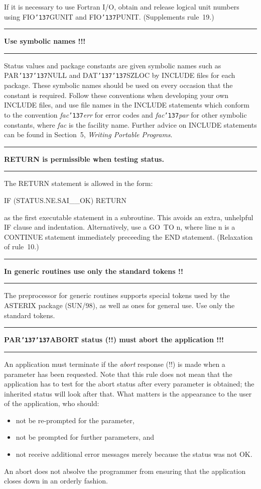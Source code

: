 \documentclass[twoside,11pt,nolof,noabs]{starlink}
\newcounter{sruleno}
\providecommand{\srule}[1]{
    \addtocounter{sruleno}{1}
    \goodbreak
    \rule{\textwidth}{0.3mm}
    \textbf{#1} \scpushright{ \textbf{\thesruleno}}
    \rule{\textwidth}{0.1mm}
}
\renewcommand{\_}{{\tt\char'137}}
\begin{document}
If it is necessary to use Fortran I/O, obtain and release logical unit numbers
using FIO\_GUNIT and FIO\_PUNIT.
(Supplements rule~19.)

\srule{Use symbolic names !!!}
Status values and package constants are given symbolic names such as
PAR\_\_NULL and DAT\_\_SZLOC by INCLUDE files for each package.
These symbolic names should be used on every occasion that the constant is
required.  Follow these conventions when developing your own
INCLUDE files, and use file names in the INCLUDE statements
which conform to the convention \textit{fac}\_\textit{err} for
error codes and \textit{fac}\_\textit{par} for other symbolic
constants, where \textit{fac} is the facility name.  Further
advice on INCLUDE statements can be found in Section~5, \textit{Writing
Portable Programs}.

\srule{RETURN is permissible when testing status.}
The RETURN statement is allowed in the form:
\begin{terminalv}
    IF (STATUS.NE.SAI__OK) RETURN
\end{terminalv}
as the first executable statement in a subroutine.
This avoids an extra, unhelpful IF clause and indentation.
Alternatively, use a GO~TO n, where line n is a CONTINUE statement immediately
preceeding the END statement.
(Relaxation of rule~10.)

\srule{In generic routines use only the standard tokens !!}
The preprocessor for
generic routines supports special tokens used by the \mbox{ASTERIX}
package (SUN/98), as well
as ones for general use.  Use only the standard tokens.

\srule{PAR\_\_ABORT status (!!) must abort the application !!!}
An application must terminate if the \textit{abort} response (!!) is
made when a parameter has been requested.  Note that this rule
does not mean that the application has to test for the abort
status after every parameter is obtained;  the inherited
status will look after that.  What matters is the appearance to the
user of the application, who should:
\begin{itemize}
\item not be re-prompted for the parameter,
\item not be prompted for further parameters, and
\item not receive additional error messages merely because
the status was not OK.
\end{itemize}
An abort does not absolve the programmer from ensuring that the
application closes down in an orderly fashion.
\end{document}
